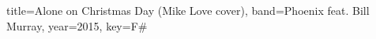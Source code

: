 \documentclass{bekki-leadsheet}
\begin{document}
\begin{song}{title={Alone on Christmas Day (Mike Love cover)}, band={Phoenix feat. Bill Murray}, year={2015}, key={F#}}



\end{song}
\end{document}
